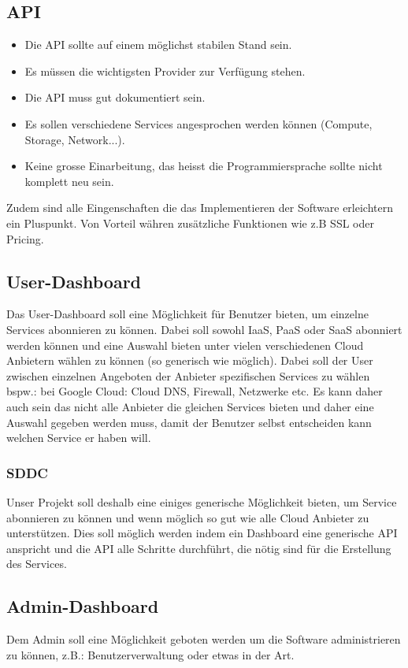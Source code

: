 

\subsection{API}
\begin{itemize}
\item Die API sollte auf einem möglichst stabilen Stand sein.
\item Es müssen die wichtigsten Provider zur Verfügung stehen.
\item Die API muss gut dokumentiert sein.
\item Es sollen verschiedene Services angesprochen werden können (Compute, Storage, Network...).
\item Keine grosse Einarbeitung, das heisst die Programmiersprache sollte nicht komplett neu sein.
\end{itemize}

Zudem sind alle Eingenschaften die das Implementieren der Software erleichtern ein 
Pluspunkt. Von Vorteil währen zusätzliche Funktionen wie z.B SSL oder Pricing. 

\subsection{User-Dashboard}
Das User-Dashboard soll eine Möglichkeit für Benutzer bieten, um einzelne Services 
abonnieren zu können.
Dabei soll sowohl \ac{IaaS}, \ac{PaaS} oder \ac{SaaS} abonniert werden können und eine Auswahl 
bieten unter vielen verschiedenen Cloud Anbietern wählen zu können (so generisch wie 
möglich).
Dabei soll der User zwischen einzelnen Angeboten der Anbieter spezifischen 
Services zu wählen bspw.: bei Google Cloud: Cloud DNS, Firewall, Netzwerke etc.
Es kann daher auch sein das nicht alle Anbieter die gleichen Services bieten und 
daher eine Auswahl gegeben werden muss, damit der Benutzer selbst entscheiden 
kann welchen Service er haben will.

\subsubsection{SDDC}
Unser Projekt soll deshalb eine einiges generische Möglichkeit bieten, um 
Service abonnieren zu können und wenn möglich so gut wie alle Cloud Anbieter zu 
unterstützen.
Dies soll möglich werden indem ein Dashboard eine generische API anspricht und 
die API alle Schritte durchführt, die nötig sind für die Erstellung des 
Services.

\subsection{Admin-Dashboard}
Dem Admin soll eine Möglichkeit geboten werden um die Software administrieren zu 
können, z.B.: Benutzerverwaltung oder etwas in der Art.
